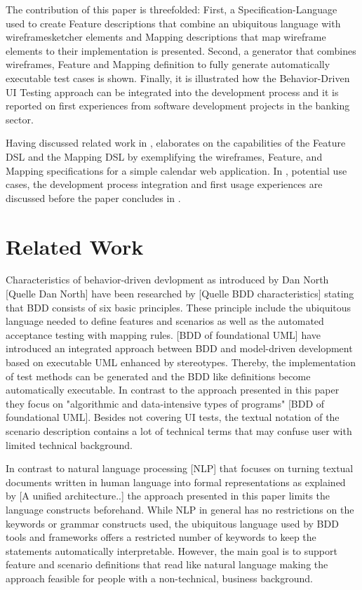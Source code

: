 \documentclass{sig-alternate-05-2015}
\begin{document}
The contribution of this paper is threefolded:
First, a Specification-Language used to create Feature descriptions that combine an ubiquitous language with wireframesketcher elements and Mapping descriptions that map wireframe elements to their implementation is presented.
Second, a generator that combines wireframes, Feature and Mapping definition to fully generate automatically executable test cases is shown.
Finally, it is illustrated how the Behavior-Driven UI Testing approach can be integrated into the development process and it is reported on first experiences from software development projects in the banking sector.


Having discussed related work in ,  elaborates on the capabilities of the Feature DSL and the Mapping DSL by exemplifying the wireframes, Feature, and Mapping specifications for a simple calendar web application.
In , potential use cases, the development process integration and first usage experiences are discussed before the paper concludes in .


\section{Related Work}\label{sec:RelatedWork}
Characteristics of behavior-driven devlopment as introduced by Dan North [Quelle Dan North] have been researched by [Quelle BDD characteristics] stating that BDD consists of six basic principles.
These principle include the ubiquitous language needed to define features and scenarios as well as the automated acceptance testing with mapping rules.
[BDD of foundational UML] have introduced an integrated approach between BDD and model-driven development based on executable UML enhanced by stereotypes.
Thereby, the implementation of test methods can be generated and the BDD like definitions become automatically executable.
In contrast to the approach presented in this paper they focus on "algorithmic and data-intensive types of programs" [BDD of foundational UML].
Besides not covering UI tests, the textual notation of the scenario description contains a lot of technical terms that may confuse user with limited technical background.

In contrast to natural language processing [NLP] that focuses on turning textual documents written in human language into formal representations as explained by [A unified architecture..] the approach presented in this paper limits the language constructs beforehand.
While NLP in general has no restrictions on the keywords or grammar constructs used, the ubiquitous language used by BDD tools and frameworks offers a restricted number of keywords to keep the statements automatically interpretable.
However, the main goal is to support feature and scenario definitions that read like natural language making the approach feasible for people with a non-technical, business background.
\end{document}
